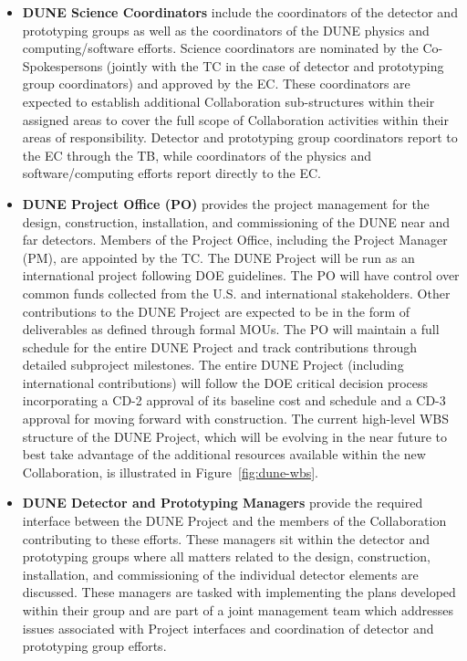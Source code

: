 \begin{itemize}
\item \textbf{DUNE Science Coordinators} include the coordinators of the detector and prototyping groups as well as the coordinators of the DUNE physics and computing/software efforts.  Science coordinators are nominated by the Co-Spokespersons (jointly with the TC in the case of detector and prototyping group coordinators) and approved by the EC.  These coordinators are expected to establish additional Collaboration sub-structures within their assigned areas to cover the full scope of Collaboration activities within their areas of responsibility.  Detector and prototyping group coordinators report to the EC through the TB, while coordinators of the physics and software/computing efforts report directly to the EC.

\item \textbf{DUNE Project Office (PO)} provides the project management for the design, construction, installation, and commissioning of the DUNE near and far detectors.  Members of the Project Office, including the Project Manager (PM), are appointed by the  TC.  The DUNE Project will be run as an international project following DOE guidelines.  The PO will have control over common funds collected from the U.S. and international stakeholders.  Other contributions to the DUNE Project are expected to be in the form of deliverables as defined through formal MOUs. The PO will maintain a full schedule for the entire DUNE Project and track contributions through detailed subproject milestones.  The entire DUNE Project (including international contributions) will follow the DOE critical decision process incorporating a CD-2 approval of its baseline cost and schedule and a CD-3 approval for moving forward with construction.  The current high-level WBS structure of the DUNE Project, which will be evolving in the near future to best take advantage of the additional resources available within the new Collaboration, is illustrated in Figure~\ref{fig:dune-wbs}.

\item \textbf{DUNE Detector and Prototyping Managers} provide the required interface between the DUNE Project and the members of the Collaboration contributing to these efforts.  These managers sit within the detector and prototyping groups where all matters related to the design, construction, installation, and commissioning of the individual detector elements are discussed.  These managers are tasked with implementing the plans developed within their group and are part of a joint management team which addresses issues associated with Project interfaces and coordination of detector and prototyping group efforts.
\end{itemize}

